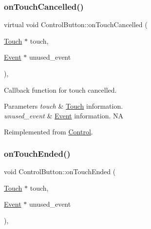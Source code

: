 \mbox{\label{classControlButton_a32a7a37982d52d6660b532adabb8099e}} 
\subsubsection{\texorpdfstring{on\+Touch\+Cancelled()}{onTouchCancelled()}\hspace{0.1cm}{\footnotesize\ttfamily [2/2]}}
{\footnotesize\ttfamily virtual void Control\+Button\+::on\+Touch\+Cancelled (\begin{DoxyParamCaption}\item[{\hyperlink{classTouch}{Touch} $\ast$}]{touch,  }\item[{\hyperlink{classEvent}{Event} $\ast$}]{unused\+\_\+event }\end{DoxyParamCaption})\hspace{0.3cm}{\ttfamily [override]}, {\ttfamily [virtual]}}

Callback function for touch cancelled.


\begin{DoxyParams}{Parameters}
{\em touch} & \hyperlink{classTouch}{Touch} information. \\
\hline
{\em unused\+\_\+event} & \hyperlink{classEvent}{Event} information.  NA \\
\hline
\end{DoxyParams}


Reimplemented from \hyperlink{classControl_a573efad6a6b492f4a6f4c5d06f0cdb88}{Control}.

\mbox{\label{classControlButton_a6f562dc0b399591189883ea7788603d7}} 
\subsubsection{\texorpdfstring{on\+Touch\+Ended()}{onTouchEnded()}\hspace{0.1cm}{\footnotesize\ttfamily [1/2]}}
{\footnotesize\ttfamily void Control\+Button\+::on\+Touch\+Ended (\begin{DoxyParamCaption}\item[{\hyperlink{classTouch}{Touch} $\ast$}]{touch,  }\item[{\hyperlink{classEvent}{Event} $\ast$}]{unused\+\_\+event }\end{DoxyParamCaption})\hspace{0.3cm}{\ttfamily [override]}, {\ttfamily [virtual]}}

